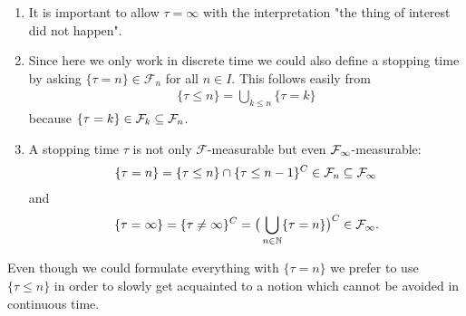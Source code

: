 \begin{remark}
	\begin{enumerate}[label=(\roman*)]
		\item It is important to allow $\tau=\infty$ with the interpretation  "{}the thing of interest did not happen"{}.
				\item	Since here we only work in discrete time we could also define a stopping time by asking $\{\tau=n\}\in \mathcal F_n$ for all $n\in I$. This follows easily from
			\begin{align*}
				 \lbrace \tau \leq n \rbrace = \bigcup\limits_{k\leq n}\lbrace \tau = k \rbrace 
			\end{align*}
			because $\lbrace \tau = k \rbrace \in \mathcal{F}_k \subseteq \mathcal{F}_n$.
		\item
			A stopping time $\tau$ is not only $\mathcal F$-measurable but even $\mathcal{F}_{\infty}$-measurable:
			\begin{align*}
				\lbrace \tau =n \rbrace=\lbrace \tau \leq n\}\cap \{\tau \leq n-1\}^C\in \mathcal{F}_n\subseteq  \mathcal{F}_{\infty}
			\end{align*}
			and
			\begin{align*}
				\lbrace \tau = \infty \rbrace = \lbrace \tau \neq \infty \rbrace^C = \big( \bigcup\limits_{n\in\mathbb{N}} \lbrace \tau = n \rbrace \big)^C \in \mathcal{F}_{\infty}.
			\end{align*}	
	\end{enumerate}
\end{remark}
Even though we could formulate everything with $\{\tau =n\}$ we prefer to use $\{\tau \leq n\}$ in order to slowly get acquainted to a notion which cannot be avoided in continuous time.\smallskip


